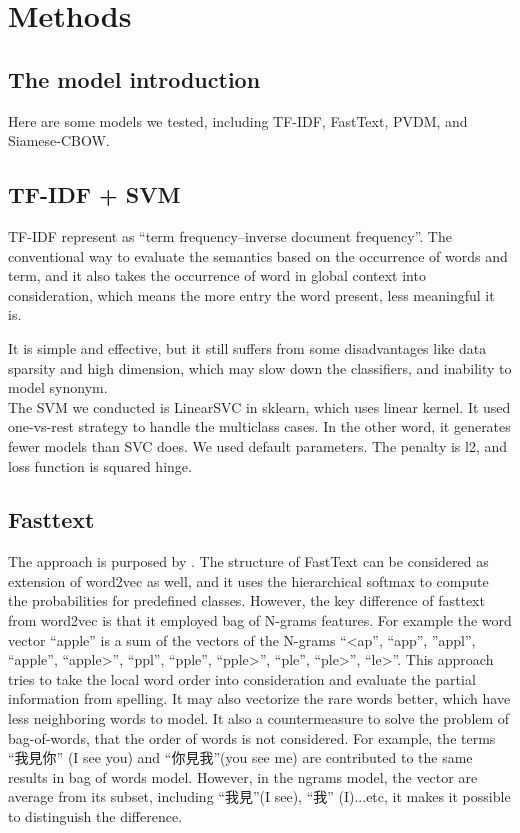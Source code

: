 \chapter{Methods}

\section{The model introduction}

Here are some models we tested, including TF-IDF, FastText, PVDM, and Siamese-CBOW.

\section{TF-IDF + SVM}

	TF-IDF represent as \enquote{term frequency–inverse document frequency}. The conventional way to evaluate the semantics based on the occurrence of words and term, 
  and it also takes the occurrence of word in global context into consideration, which means the more entry the word present, less meaningful it is.

  It is simple and effective, but it still suffers from some disadvantages like data sparsity and high dimension, which may slow down the classifiers, and inability to model synonym. \\

  The SVM we conducted is LinearSVC in sklearn, which uses linear kernel. It used one-vs-rest strategy to handle the multiclass cases.
  In the other word, it generates fewer models than SVC does.
  We used default parameters. The penalty is l2, and loss function is squared hinge. 

\section{Fasttext}
	
The approach is purposed by \cite{joulin2016fasttext}. 
The structure of FastText can be considered as extension of word2vec as well, and it uses the hierarchical softmax to compute the probabilities for predefined classes. 
However, the key difference of fasttext from word2vec is that it employed bag of N-grams features. 
For example the word vector “apple” is a sum of the vectors of the N-grams “\textless ap”, “app”, ”appl”, “apple”, “apple\textgreater”, “ppl”, “pple”, “pple\textgreater”, “ple”, “ple\textgreater”, “le\textgreater”.
This approach tries to take the local word order into consideration and evaluate the partial information from spelling. It may also vectorize the rare words better, which have less neighboring words to model.
It also a countermeasure to solve the problem of bag-of-words, that the order of words is not considered. 
For example, the terms \enquote{我見你} (I see you) and \enquote{你見我}(you see me) are contributed to the same results in bag of words model.
However, in the ngrams model, the vector are average from its subset, including \enquote{我見}(I see), \enquote{我} (I)...etc, it makes it possible to distinguish the difference.

